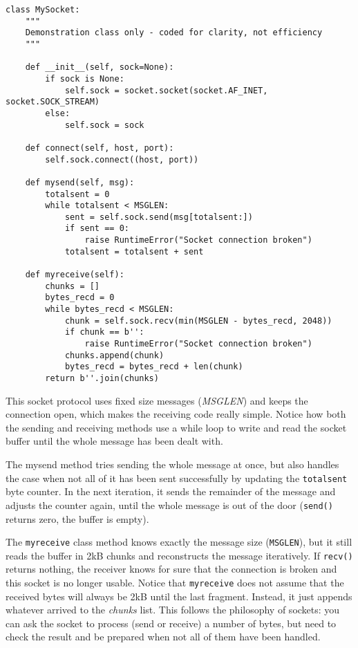 \begin{lstlisting}[style=python]
  class MySocket:
    """
    Demonstration class only - coded for clarity, not efficiency
    """

    def __init__(self, sock=None):
        if sock is None:
            self.sock = socket.socket(socket.AF_INET, socket.SOCK_STREAM)
        else:
            self.sock = sock

    def connect(self, host, port):
        self.sock.connect((host, port))

    def mysend(self, msg):
        totalsent = 0
        while totalsent < MSGLEN:
            sent = self.sock.send(msg[totalsent:])
            if sent == 0:
                raise RuntimeError("Socket connection broken")
            totalsent = totalsent + sent

    def myreceive(self):
        chunks = []
        bytes_recd = 0
        while bytes_recd < MSGLEN:
            chunk = self.sock.recv(min(MSGLEN - bytes_recd, 2048))
            if chunk == b'':
                raise RuntimeError("Socket connection broken")
            chunks.append(chunk)
            bytes_recd = bytes_recd + len(chunk)
        return b''.join(chunks)
\end{lstlisting}

This socket protocol uses fixed size messages (\emph{MSGLEN}) and keeps the connection open, which makes the receiving code really simple. Notice how both the sending and receiving methods use a while loop to write and read the socket buffer until the whole message has been dealt with.

The mysend method tries sending the whole message at once, but also handles the case when not all of it has been sent successfully by updating the \texttt{totalsent} byte counter. In the next iteration, it sends the remainder of the message and adjusts the counter again, until the whole message is out of the door (\texttt{send()} returns zero, the buffer is empty).

The \texttt{myreceive} class method knows exactly the message size (\texttt{MSGLEN}), but it still reads the buffer in 2kB chunks and reconstructs the message iteratively. If \texttt{recv()} returns nothing, the receiver knows for sure that the connection is broken and this socket is no longer usable. Notice that \texttt{myreceive} does not assume that the received bytes will always be 2kB until the last fragment. Instead, it just appends whatever arrived to the \emph{chunks} list. This follows the philosophy of sockets: you can ask the socket to process (send or receive) a number of bytes, but need to check the result and be prepared when not all of them have been handled.

